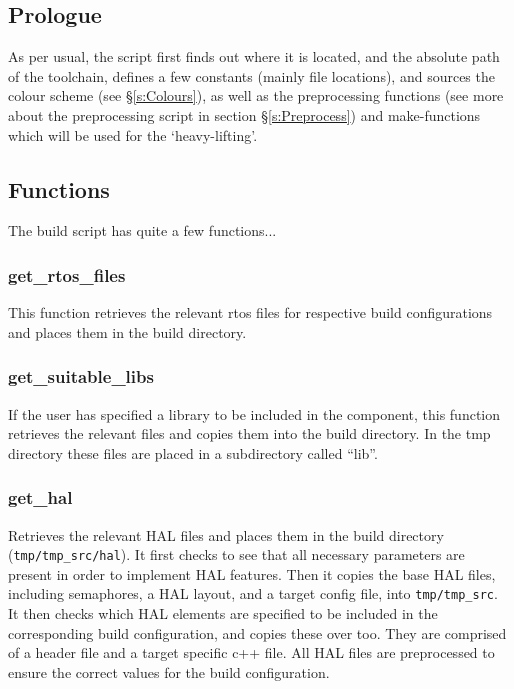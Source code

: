 \documentclass[a4paper, oneside, 11pt, titlepage, onecolumn, openright]{report}
\begin{document}
\subsection{Prologue}
			\label{ss:buildPrologue}
			As per usual, the script first finds out where it is located, and the absolute path of the toolchain, defines a few constants (mainly file locations), and sources the colour scheme (see \S\ref{s:Colours}), as well as the preprocessing functions (see more about the preprocessing script in section \S\ref{s:Preprocess}) and make-functions which will be used for the `heavy-lifting'.
			
\subsection{Functions}
			\label{ss:buildFunctions}
			The build script has quite a few functions...
						
\subsubsection{get\_rtos\_files}
			\label{sss:buildGetrtosfiles}
			This function retrieves the relevant rtos files for respective build configurations and places them in the build directory.
			
\subsubsection{get\_suitable\_libs}
			\label{sss:buildGetsuitablelibs}
			If the user has specified a library to be included in the component, this function retrieves the relevant files and copies them into the build directory. In the tmp directory these files are placed in a subdirectory called ``lib''.
			
\subsubsection{get\_hal}
			\label{sss:buildGethal}
			Retrieves the relevant HAL files and places them in the build directory (\texttt{tmp/tmp\_src/hal}). It first checks to see that all necessary parameters are present in order to implement HAL features. Then it copies the base HAL files, including semaphores, a HAL layout, and a target config file, into \texttt{tmp/tmp\_src}. \newline
			It then checks which HAL elements are specified to be included in the corresponding build configuration, and copies these over too. They are comprised of a header file and a target specific c++ file. All HAL files are preprocessed to ensure the correct values for the build configuration.
			
\end{document}
